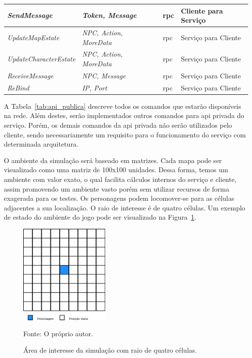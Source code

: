 \begin{table}[htb!]
\begin{adjustbox}{max width=\textwidth}
\begin{tabular}{|l|l|l|l|l|}
\textit{SendMessage}           & \textit{Token, Message}        &           & \ac{rpc}           & Cliente para Serviço \\ \hline
\textit{UpdateMapEstate}       & \textit{NPC, Action, MoreData} &           & \ac{rpc}           & Serviço para Cliente \\ \hline
\textit{UpdateCharacterEstate} & \textit{NPC, Action, MoreData} &           & \ac{rpc}           & Serviço para Cliente \\ \hline
\textit{ReceiveMessage}        & \textit{NPC, Message}          &           & \ac{rpc}           & Serviço para Cliente \\ \hline
\textit{ReBind}                & \textit{IP, Port}              &           & \ac{rpc}           & Serviço para Cliente \\ \hline
\end{tabular}
\end{adjustbox}
\end{table}

A Tabela~\ref{tab:api_publica} descreve todos os comandos que estarão disponíveis na rede.
%
Além destes, serão implementados outros comandos para \ac{api} privada do serviço.
%
Porém, os demais comandos da \ac{api} privada não serão utilizados pelo cliente, sendo necessariamente um requisito para o funcionamento do serviço com determinada arquitetura.


O ambiente da simulação será baseado em matrizes.
%
Cada mapa pode ser visualizado como uma matriz de 100x100 unidades.
%
Dessa forma, temos um ambiente com valor exato, o qual facilita cálculos internos do serviço e cliente, assim promovendo um ambiente vasto porém sem utilizar recursos de forma exagerada para os testes.
%
Os personagens podem locomover-se para as células adjacentes a sua localização.
%
O raio de interesse é de quatro células.
%
Um exemplo de estado do ambiente do jogo pode ser visualizado na Figura~\ref{fig:roi}.

\begin{figure}[htb!]
  \caption{Área de interesse da simulação com raio de quatro células.}
  \label{fig:roi}
  \includegraphics[height=5.0cm]{img/cap3/roi.png}
  \centering

  Fonte: O próprio autor.
\end{figure}

